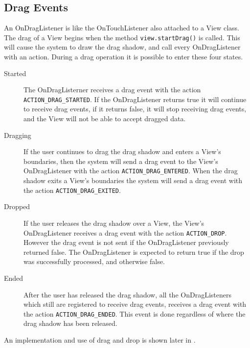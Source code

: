 \subsection*{Drag Events}
An OnDragListener is like the OnTouchListener also attached to a View class. The drag of a View begins when the method \lstinline|view.startDrag()| is called. This will cause the system to draw the drag shadow, and call every OnDragListener with an action. During a drag operation it is possible to enter these four states.
\begin{description}
\item[Started] The OnDragListerner receives a drag event with the action \lstinline|ACTION_DRAG_STARTED|. If the OnDragListener returns true it will continue to receive drag events, if it returns false, it will stop receiving drag events, and the View will not be able to accept dragged data.

\item[Dragging] If the user continues to drag the drag shadow and enters a View's boundaries, then the system will send a drag event to the View's OnDragListener with the action \lstinline|ACTION_DRAG_ENTERED|. When the drag shadow exits a View's boundaries the system will send a drag event with the action \lstinline|ACTION_DRAG_EXITED|.

\item[Dropped] If the user releases the drag shadow over a View, the View's OnDragListener receives a drag event with the action \lstinline|ACTION_DROP|. However the drag event is not sent if the OnDragListener previously returned false. The OnDragListener is expected to return true if the drop was successfully processed, and otherwise false.

\item[Ended] After the user has released the drag shadow, all the OnDragListeners which still are registered to receive drag events, receives a drag event with the action \lstinline|ACTION_DRAG_ENDED|. This event is done regardless of where the drag shadow has been released.
\end{description}
An implementation and use of drag and drop is shown later in .

